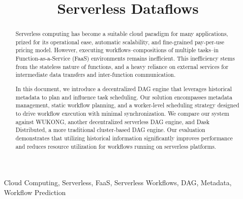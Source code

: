 \documentclass[conference]{IEEEtran}
\begin{document}
\title{Serverless Dataflows}

\author{
\and
}
\maketitle

\begin{abstract}
Serverless computing has become a suitable cloud paradigm for many applications, prized for its operational ease, automatic scalability, and fine-grained pay-per-use pricing model. However, executing workflows--compositions of multiple tasks--in Function-as-a-Service (FaaS) environments remains inefficient. This inefficiency stems from the stateless nature of functions, and a heavy reliance on external services for intermediate data transfers and inter-function communication.

In this document, we introduce a decentralized DAG engine that leverages historical metadata to plan and influence task scheduling. Our solution encompasses metadata management, static workflow planning, and a worker-level scheduling strategy designed to drive workflow execution with minimal synchronization. We compare our system against WUKONG, another decentralized serverless DAG engine, and Dask Distributed, a more traditional cluster-based DAG engine. Our evaluation demonstrates that utilizing historical information significantly improves performance and reduces resource utilization for workflows running on serverless platforms.
\end{abstract}

\begin{IEEEkeywords}
Cloud Computing, Serverless, FaaS, Serverless Workflows, DAG, Metadata, Workflow Prediction
\end{IEEEkeywords}
\end{document}
